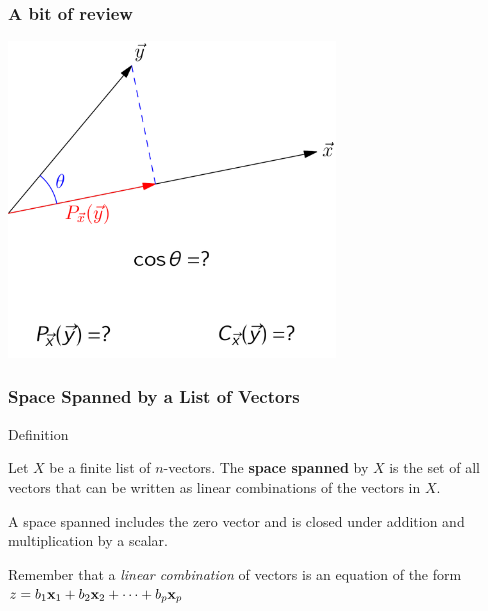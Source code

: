 \documentclass{beamer}
\begin{document}
\begin{frame}[fragile]
  \frametitle{A bit of review}

\begin{center}
\includegraphics[width=0.65\textwidth]{geomreview.pdf}
\end{center}

\end{frame}



\begin{frame}
  \frametitle{Space Spanned by a List of Vectors}


\begin{block}{Definition}

Let $X$ be a finite list of $n$-vectors. The \textbf{space spanned} by $X$ is the set of all vectors that can be written as linear combinations of the vectors in $X$.
\medskip

A space spanned includes the zero vector and is closed under addition and multiplication by a scalar.

\end{block}
\bigskip

Remember that a \emph{linear combination} of vectors is an equation of the form $z = b_1 \mathbf{x}_1 + b_2 \mathbf{x}_2 + \cdots + b_p \mathbf{x}_p$

\end{frame}

\end{document}
